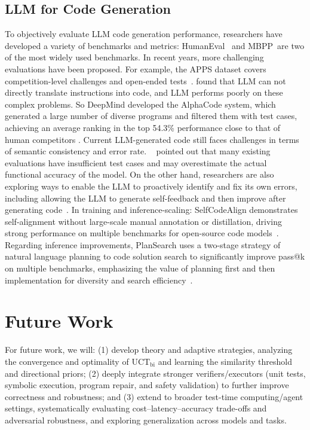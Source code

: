 \documentclass{article} %
\theoremstyle{definition}
\theoremstyle{remark}
\begin{document}
\subsection{LLM for Code Generation}
To objectively evaluate LLM code generation performance, researchers have developed a variety of benchmarks and metrics: HumanEval~\citep{chen2021evaluating} and MBPP~\citep{austin2021program}are two of the most widely used benchmarks. In recent years, more challenging evaluations have been proposed. For example, the APPS dataset covers competition-level challenges and open-ended tests~\citep{hendrycks2021measuring}. \cite{hendrycks2021measuring} found that LLM can not directly translate instructions into code, and LLM performs poorly on these complex problems. So DeepMind developed the AlphaCode system, which generated a large number of diverse programs and filtered them with test cases, achieving an average ranking in the top 54.3\%  performance close to that of human competitors \citep{li2022competition}. Current LLM-generated code still faces challenges in terms of semantic consistency and error rate. ~\cite{liu2023is} pointed out that many existing evaluations have insufficient test cases and may overestimate the actual functional accuracy of the model. On the other hand, researchers are also exploring ways to enable the LLM to proactively identify and fix its own errors, including allowing the LLM to generate self-feedback and then improve after generating code~\citep{madaan2023selfrefine}. In training and inference-scaling: SelfCodeAlign demonstrates self-alignment without large-scale manual annotation or distillation, driving strong performance on multiple benchmarks for open-source code models~\cite{weiselfcodealign}. Regarding inference improvements, PlanSearch uses a two-stage strategy of natural language planning to code solution search to significantly improve pass@k on multiple benchmarks, emphasizing the value of planning first and then implementation for diversity and search efficiency~\citep{wang2025planning}.


\section{Future Work}
For future work, we will: (1) develop theory and adaptive strategies, analyzing the convergence and optimality of $\mathrm{UCT}_{\text{bi}}$ and learning the similarity threshold and directional priors; (2) deeply integrate stronger verifiers/executors (unit tests, symbolic execution, program repair, and safety validation) to further improve correctness and robustness; and (3) extend to broader test-time computing/agent settings, systematically evaluating cost--latency--accuracy trade-offs and adversarial robustness, and exploring generalization across models and tasks.
\end{document}
